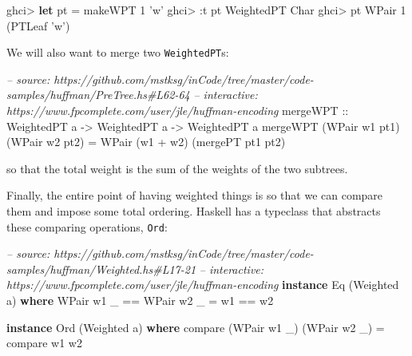 \documentclass[]{article}
\newenvironment{Shaded}{\begin{snugshade}}{\end{snugshade}}
\newcommand{\CharTok}[1]{\textcolor[rgb]{0.31,0.60,0.02}{#1}}
\newcommand{\CommentTok}[1]{\textcolor[rgb]{0.56,0.35,0.01}{\textit{#1}}}
\newcommand{\DataTypeTok}[1]{\textcolor[rgb]{0.13,0.29,0.53}{#1}}
\newcommand{\DecValTok}[1]{\textcolor[rgb]{0.00,0.00,0.81}{#1}}
\newcommand{\FunctionTok}[1]{\textcolor[rgb]{0.00,0.00,0.00}{#1}}
\newcommand{\KeywordTok}[1]{\textcolor[rgb]{0.13,0.29,0.53}{\textbf{#1}}}
\newcommand{\NormalTok}[1]{#1}
\newcommand{\OtherTok}[1]{\textcolor[rgb]{0.56,0.35,0.01}{#1}}
\begin{document}
\begin{Shaded}
\begin{Highlighting}[]
\NormalTok{ghci}\FunctionTok{>} \KeywordTok{let}\NormalTok{ pt }\FunctionTok{=}\NormalTok{ makeWPT }\DecValTok{1} \CharTok{'w'}
\NormalTok{ghci}\FunctionTok{>} \FunctionTok{:}\NormalTok{t pt}
\DataTypeTok{WeightedPT} \DataTypeTok{Char}
\NormalTok{ghci}\FunctionTok{>}\NormalTok{ pt}
\DataTypeTok{WPair} \DecValTok{1}\NormalTok{ (}\DataTypeTok{PTLeaf} \CharTok{'w'}\NormalTok{)}
\end{Highlighting}
\end{Shaded}

We will also want to merge two \texttt{WeightedPT}s:

\begin{Shaded}
\begin{Highlighting}[]
\CommentTok{-- source: https://github.com/mstksg/inCode/tree/master/code-samples/huffman/PreTree.hs#L62-64}
\CommentTok{-- interactive: https://www.fpcomplete.com/user/jle/huffman-encoding}
\OtherTok{mergeWPT ::} \DataTypeTok{WeightedPT}\NormalTok{ a }\OtherTok{->} \DataTypeTok{WeightedPT}\NormalTok{ a }\OtherTok{->} \DataTypeTok{WeightedPT}\NormalTok{ a}
\NormalTok{mergeWPT (}\DataTypeTok{WPair}\NormalTok{ w1 pt1) (}\DataTypeTok{WPair}\NormalTok{ w2 pt2)}
    \FunctionTok{=} \DataTypeTok{WPair}\NormalTok{ (w1 }\FunctionTok{+}\NormalTok{ w2) (mergePT pt1 pt2)}
\end{Highlighting}
\end{Shaded}

so that the total weight is the sum of the weights of the two subtrees.

Finally, the entire point of having weighted things is so that we can compare
them and impose some total ordering. Haskell has a typeclass that abstracts
these comparing operations, \texttt{Ord}:

\begin{Shaded}
\begin{Highlighting}[]
\CommentTok{-- source: https://github.com/mstksg/inCode/tree/master/code-samples/huffman/Weighted.hs#L17-21}
\CommentTok{-- interactive: https://www.fpcomplete.com/user/jle/huffman-encoding}
\KeywordTok{instance} \DataTypeTok{Eq}\NormalTok{ (}\DataTypeTok{Weighted}\NormalTok{ a) }\KeywordTok{where}
    \DataTypeTok{WPair}\NormalTok{ w1 _ }\FunctionTok{==} \DataTypeTok{WPair}\NormalTok{ w2 _ }\FunctionTok{=}\NormalTok{ w1 }\FunctionTok{==}\NormalTok{ w2}

\KeywordTok{instance} \DataTypeTok{Ord}\NormalTok{ (}\DataTypeTok{Weighted}\NormalTok{ a) }\KeywordTok{where}
\NormalTok{    compare (}\DataTypeTok{WPair}\NormalTok{ w1 _) (}\DataTypeTok{WPair}\NormalTok{ w2 _) }\FunctionTok{=}\NormalTok{ compare w1 w2}
\end{Highlighting}
\end{Shaded}
\end{document}
